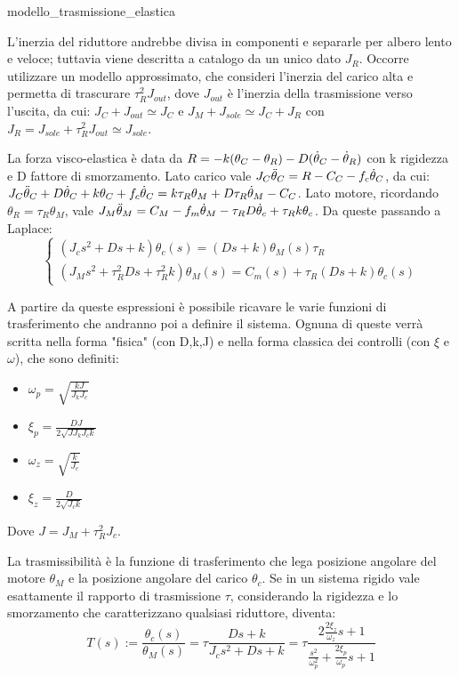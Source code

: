 
{modello_trasmissione_elastica}

L'inerzia del riduttore andrebbe divisa in componenti e separarle per albero lento e veloce; tuttavia viene descritta a catalogo da un unico dato \(J_R\).
Occorre utilizzare un modello approssimato, che consideri l'inerzia del carico alta e permetta di trascurare \(\tau^2_R J_{out}\), dove \(J_{out}\) è l'inerzia della trasmissione verso l'uscita, da cui: \(J_C + J_{out} \simeq J_C\) e \(J_M + J_{sole} \simeq J_C + J_R\) con \(J_R = J_{sole} + \tau^2_R J_{out} \simeq J_{sole}\).

La forza visco-elastica è data da \(R = -k(\theta_C - \theta_R) - D(\dot{\theta}_C - \dot{\theta}_R) \) con k rigidezza e D fattore di smorzamento.
Lato carico vale \(J_C \Ddot{\theta}_C = R - C_C - f_c \dot{\theta}_C\), da cui: \(J_C \Ddot{\theta}_C + D\dot{\theta}_C + k\theta_C + f_c \dot{\theta}_C = k \tau_R \theta_M + D \tau_R \dot{\theta}_M - C_C\).
Lato motore, ricordando \(\theta_R = \tau_R \theta_M\), vale \(J_M \Ddot{\theta}_M = C_M - f_m \dot{\theta}_M - \tau_R D \dot{\theta}_c + \tau_R k \theta_c\).
Da queste passando a Laplace:
\[
\begin{cases}
    (J_c s^2 + D s + k) \theta_c(s) = (D s + k)\theta_M(s) \tau_R \\
    (J_M s^2 + \tau_R^2 D s + \tau_R^2 k)\theta_M(s) = C_m(s) + \tau_R (D s + k)\theta_c(s)
\end{cases}
\]

A partire da queste espressioni è possibile ricavare le varie funzioni di trasferimento che andranno poi a definire il sistema. Ognuna di queste verrà scritta nella forma "fisica" (con D,k,J) e nella forma classica dei controlli (con \(\xi\) e \(\omega\)), che sono definiti:
\begin{itemize}
    \item \(\omega_p = \sqrt{\frac{k J}{J_k J_c}}\)
    \item \(\xi_p = \frac{D J}{2 \sqrt{J J_k J_c k}}\)
    \item \(\omega_z = \sqrt{\frac{k}{J_c}}\)
    \item \(\xi_z = \frac{D}{2\sqrt{J_c k}}\)
\end{itemize}
Dove \(J = J_M + \tau_R^2 J_c\).

La trasmissibilità è la funzione di trasferimento che lega posizione angolare del motore \(\theta_M\) e la posizione angolare del carico \(\theta_c\). Se in un sistema rigido vale esattamente il rapporto di trasmissione \(\tau\), considerando la rigidezza e lo smorzamento che caratterizzano qualsiasi riduttore, diventa:
\[ T(s) := \frac{\theta_c(s)}{\theta_M(s)}=\tau \frac{D s + k}{J_c s^2 + D s +k} = \tau \frac{2\frac{2\xi_z}{\omega_z} s + 1}{\frac{s^2}{\omega_p^2} + \frac{2\xi_p}{\omega_p} s + 1}\]

